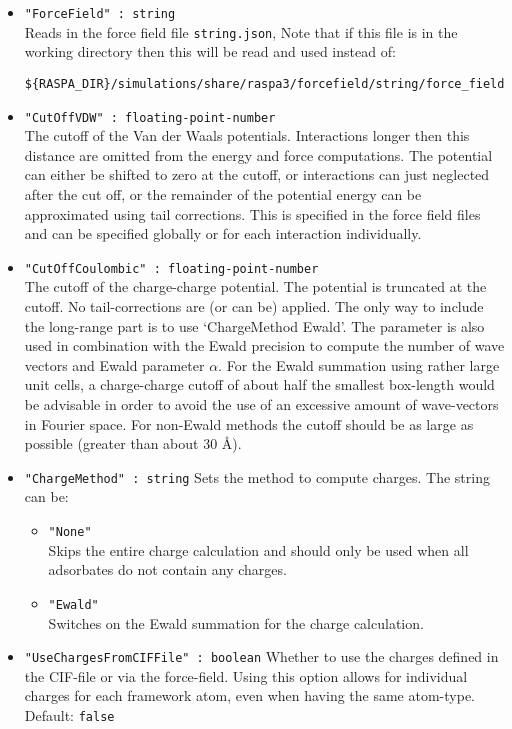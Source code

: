\begin{itemize}
\item{\verb+"ForceField" : string+}\\
Reads in the force field file \verb+string.json+,
Note that if this file is in the working directory then this will be read and used instead of:
\begin{verbatim}
${RASPA_DIR}/simulations/share/raspa3/forcefield/string/force_field.json
\end{verbatim}
\item{\verb+"CutOffVDW" : floating-point-number+}\\
The cutoff of the Van der Waals potentials. Interactions longer then this distance are omitted from the
energy and force computations. The potential can either be shifted to zero at the cutoff, or interactions
can just neglected after the cut off, or the remainder of the potential energy can be approximated using
tail corrections. This is specified in the force field files and can be specified globally or
for each interaction individually.
\item{\verb+"CutOffCoulombic" : floating-point-number+}\\
The cutoff of the charge-charge potential. The potential is truncated at the cutoff.
No tail-corrections are (or can be) applied. The only way to include the long-range part is to use `ChargeMethod Ewald'.
The parameter is also used in combination with the
Ewald precision to compute the number of wave vectors and Ewald parameter $\alpha$.
For the Ewald summation using rather large unit cells, a charge-charge cutoff of about half the smallest box-length would be advisable
in order to avoid the use of an excessive amount of wave-vectors in Fourier space. For non-Ewald methods the cutoff should be as large
as possible (greater than about 30 \AA).
\item{\verb+"ChargeMethod" : string+}
Sets the method to compute charges. The string can be:
  \begin{itemize}
  \item{\verb+"None"+}\\
    Skips the entire charge calculation and should only be used when all adsorbates do not contain any charges.
  \item{\verb+"Ewald"+}\\
    Switches on the Ewald summation for the charge calculation.
  \end{itemize}
\item{\verb+"UseChargesFromCIFFile" : boolean+}
Whether to use the charges defined in the CIF-file or via the force-field. 
Using this option allows for individual charges for each framework atom, even when having the same atom-type.
Default: \verb+false+
\end{itemize}


